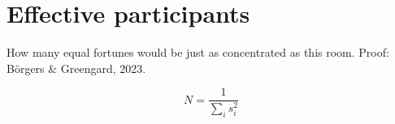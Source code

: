 \section{Effective participants}

How many equal fortunes would be just as concentrated as this room.
Proof: Börgers \& Greengard, 2023.

\begin{figure}
\end{figure}

\[ N = \frac{1}{\sum_i s_i^2} \]

